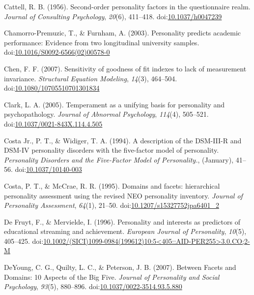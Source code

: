 \documentclass[,man,floatsintext]{apa6}
\begin{document}
\hypertarget{ref-Cattell1956}{}
Cattell, R. B. (1956). Second-order personality factors in the
questionnaire realm. \emph{Journal of Consulting Psychology},
\emph{20}(6), 411--418.
doi:\href{https://doi.org/10.1037/h0047239}{10.1037/h0047239}

\hypertarget{ref-Chamorro-Premuzic2003}{}
Chamorro-Premuzic, T., \& Furnham, A. (2003). Personality predicts
academic performance: Evidence from two longitudinal university samples.
doi:\href{https://doi.org/10.1016/S0092-6566(02)00578-0}{10.1016/S0092-6566(02)00578-0}

\hypertarget{ref-Chen2007}{}
Chen, F. F. (2007). Sensitivity of goodness of fit indexes to lack of
measurement invariance. \emph{Structural Equation Modeling},
\emph{14}(3), 464--504.
doi:\href{https://doi.org/10.1080/10705510701301834}{10.1080/10705510701301834}

\hypertarget{ref-Clark2005}{}
Clark, L. A. (2005). Temperament as a unifying basis for personality and
psychopathology. \emph{Journal of Abnormal Psychology}, \emph{114}(4),
505--521.
doi:\href{https://doi.org/10.1037/0021-843X.114.4.505}{10.1037/0021-843X.114.4.505}

\hypertarget{ref-Widiger1994}{}
Costa Jr., P. T., \& Widiger, T. A. (1994). A description of the
DSM-III-R and DSM-IV personality disorders with the five-factor model of
personality. \emph{Personality Disorders and the Five-Factor Model of
Personality.}, (January), 41--56.
doi:\href{https://doi.org/10.1037/10140-003}{10.1037/10140-003}

\hypertarget{ref-Costa1995}{}
Costa, P. T., \& McCrae, R. R. (1995). Domains and facets: hierarchical
personality assessment using the revised NEO personality inventory.
\emph{Journal of Personality Assessment}, \emph{64}(1), 21--50.
doi:\href{https://doi.org/10.1207/s15327752jpa6401_2}{10.1207/s15327752jpa6401\_2}

\hypertarget{ref-DeFruyt1996}{}
De Fruyt, F., \& Mervielde, I. (1996). Personality and interests as
predictors of educational streaming and achievement. \emph{European
Journal of Personality}, \emph{10}(5), 405--425.
doi:\href{https://doi.org/10.1002/(SICI)1099-0984(199612)10:5\%3C405::AID-PER255\%3E3.0.CO;2-M}{10.1002/(SICI)1099-0984(199612)10:5\textless{}405::AID-PER255\textgreater{}3.0.CO;2-M}

\hypertarget{ref-DeYoung2007}{}
DeYoung, C. G., Quilty, L. C., \& Peterson, J. B. (2007). Between Facets
and Domains: 10 Aspects of the Big Five. \emph{Journal of Personality
and Social Psychology}, \emph{93}(5), 880--896.
doi:\href{https://doi.org/10.1037/0022-3514.93.5.880}{10.1037/0022-3514.93.5.880}
\end{document}
